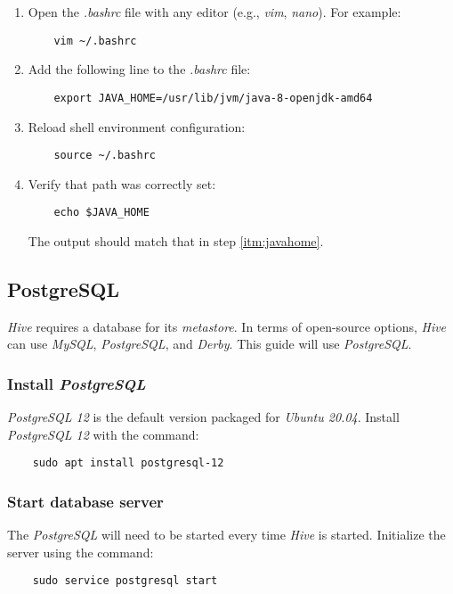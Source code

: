\documentclass{article}
\begin{document}
    \begin{enumerate}
    \item Open the \emph{.bashrc} file with any editor (e.g., \emph{vim}, \emph{nano}).
    For example:
    \begin{verbatim}
    vim ~/.bashrc
    \end{verbatim}
    
    \item Add the following line to the \emph{.bashrc} file:
    \label{itm:javahome}
    \begin{verbatim}
    export JAVA_HOME=/usr/lib/jvm/java-8-openjdk-amd64                 
    \end{verbatim}
    
    \item Reload shell environment configuration:
    \begin{verbatim}
    source ~/.bashrc
    \end{verbatim}
    
    \item Verify that path was correctly set:
    \begin{verbatim}
    echo $JAVA_HOME
    \end{verbatim}
    The output should match that in step \ref{itm:javahome}.
    \end{enumerate}

  \subsection{PostgreSQL}
  \label{subsec:postgres}
  \emph{Hive} requires a database for its \emph{metastore}. In terms of open-source options,
  \emph{Hive} can use \emph{MySQL}, \emph{PostgreSQL}, and \emph{Derby}. This guide will use
  \emph{PostgreSQL}.

    \subsubsection{Install \emph{PostgreSQL}}
    \emph{PostgreSQL 12} is the default version packaged for \emph{Ubuntu 20.04}. Install
    \emph{PostgreSQL 12} with the command:
    \begin{verbatim}
    sudo apt install postgresql-12
    \end{verbatim}

    \subsubsection{Start database server}
    \label{subsec:pgsstart}
    The \emph{PostgreSQL} will need to be started every time \emph{Hive} is started. Initialize the
    server using the command:
    \begin{verbatim}
    sudo service postgresql start
    \end{verbatim}
\end{document}
